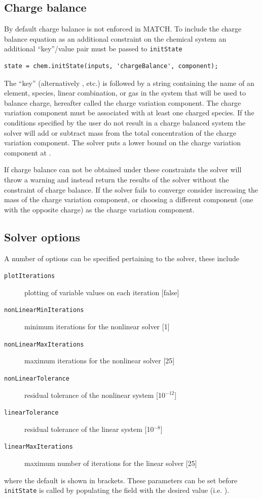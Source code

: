 \documentclass{article}
\begin{document}
\subsection{Charge balance}
By default charge balance is not enforced in MATCH. To include the charge balance equation as an additional constraint on the chemical system an additional ``key''/value pair must be passed to \verb|initState|

\begin{lstlisting}
state = chem.initState(inputs, 'chargeBalance', component);
\end{lstlisting}

The ``key''  (alternatively  ,  etc.) is followed by a string containing the name of an element, species, linear combination, or gas in the system that will be used to balance charge, hereafter called the charge variation component. The charge variation component must be associated with at least one charged species. If the conditions specified by the user do not result in a charge balanced system the solver will add or subtract mass from the total concentration of the charge variation component. The solver puts a lower bound on the charge variation component at .

If charge balance can not be obtained under these constraints the solver will throw a warning and instead return the results of the solver without the constraint of charge balance. If the solver fails to converge consider increasing the mass of the charge variation component, or choosing a different component (one with the opposite charge) as the charge variation component. 

\subsection{Solver options}

A number of options can be specified pertaining to the solver, these include
{\footnotesize
\begin{description}
        \item[\texttt{plotIterations}] plotting of variable values on each iteration [false]
        \item[\texttt{nonLinearMinIterations}]  minimum iterations for the nonlinear solver [1]
        \item[\texttt{nonLinearMaxIterations}]  maximum iterations for the nonlinear solver [25] 
        \item[\texttt{nonLinearTolerance}] residual tolerance of the nonlinear system [10$^{-12}$]
        \item[\texttt{linearTolerance}] residual tolerance of the linear system [10$^{-8}$]
        \item[\texttt{linearMaxIterations}] maximum number of iterations for the linear solver [25]
\end{description}}
where the default is shown in brackets. These parameters can be set before \verb|initState| is called by populating the field with the desired value (i.e. ).
\end{document}
